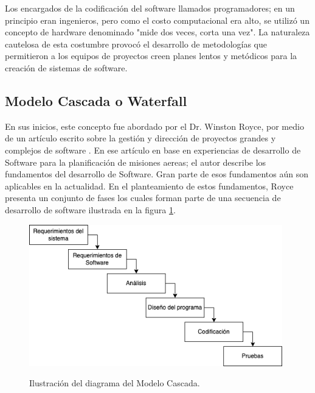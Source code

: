 Los encargados de la codificación del software llamados programadores; en un principio eran ingenieros, pero como el costo computacional era alto, se utilizó un concepto de hardware denominado "mide dos veces, corta una vez"\cite{Ganis}. La naturaleza cautelosa de esta costumbre provocó el desarrollo de metodologías que permitieron a los equipos de proyectos creen planes lentos y metódicos para la creación de sistemas de software.\\

\subsection{Modelo Cascada o Waterfall}
En sus inicios, este concepto fue abordado por el Dr. Winston Royce, por medio de un artículo escrito sobre la gestión y dirección de proyectos grandes y complejos de software \cite{Winston}. En ese artículo en base en experiencias de desarrollo de Software para la planificación de misiones aereas; el autor describe los fundamentos del desarrollo de Software. Gran parte de esos fundamentos aún son aplicables en la actualidad. En el planteamiento de estos fundamentos, Royce presenta un conjunto de fases los cuales forman parte de una secuencia de desarrollo de software ilustrada en la figura \ref{fig:cascada}.\\

\begin{figure}[H]
    \begin{center}
        \includegraphics[width=11cm]{img/capitulo_2/cascada2.png}
    \end{center}
    \begin{center}
        \caption{Ilustración del diagrama del Modelo Cascada.}
        \label{fig:cascada}
    \end{center}
\end{figure}

